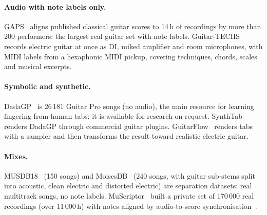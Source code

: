\paragraph{Audio with note labels only.}
GAPS~\cite{riley2024gaps} aligns published classical guitar scores to 14\,h of
recordings by more than 200 performers: the largest real guitar set with note
labels. Guitar-TECHS~\cite{pedroza2025guitartechs} records electric guitar at
once as DI, miked amplifier and room microphones, with MIDI labels from a
hexaphonic MIDI pickup, covering techniques, chords, scales and musical
excerpts.

\paragraph{Symbolic and synthetic.}
DadaGP~\cite{sarmento2021dadagp} is 26\,181 Guitar Pro songs (no audio), the
main resource for learning fingering from human tabs; it is available for
research on request. SynthTab~\cite{zang2024synthtab} renders DadaGP through
commercial guitar plugins. GuitarFlow~\cite{loth2025guitarflow} renders tabs
with a sampler and then transforms the result toward realistic electric guitar.

\paragraph{Mixes.}
MUSDB18~\cite{rafii2017musdb18} (150 songs) and
MoisesDB~\cite{pereira2023moisesdb} (240 songs, with guitar sub-stems split into
acoustic, clean electric and distorted electric) are separation datasets: real
multitrack songs, no note labels. MuScriptor~\cite{rouard2026muscriptor} built a
private set of 170\,000 real recordings (over 11\,000\,h) with notes aligned by
audio-to-score synchronisation~\cite{muller2021sync}.

